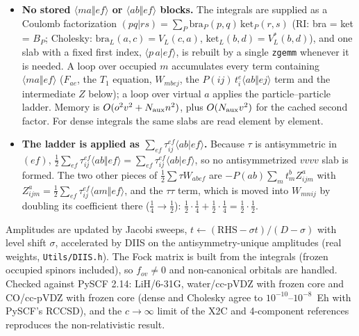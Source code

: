 \documentclass[11pt]{article}
\newcommand{\anti}[4]{\langle #1#2\Vert #3#4\rangle}
\newcommand{\dir}[4]{\langle #1#2|#3#4\rangle}
\begin{document}
\begin{itemize}
\item \textbf{No stored $\langle ma\Vert ef\rangle$ or $\langle ab\Vert ef\rangle$ blocks.} The integrals are
 supplied as a Coulomb factorization $(pq|rs)=\sum_P \mathrm{bra}_P(p,q)\,\mathrm{ket}_P(r,s)$ (RI: bra = ket = $B_P$;
 Cholesky: $\mathrm{bra}_L(a,c)=V_L(c,a)$, $\mathrm{ket}_L(b,d)=V_L^*(b,d)$), and one slab with a fixed first index,
 $\langle p\,a|e f\rangle$, is rebuilt by a single \texttt{zgemm} whenever it is needed. A loop over occupied $m$
 accumulates every term containing $\langle ma\Vert ef\rangle$ ($F_{ae}$, the $T_1$ equation, $W_{mbej}$, the
 $P(ij)\,t_i^e\langle ab\Vert ej\rangle$ term and the intermediate $Z$ below); a loop over virtual $a$ applies
 the particle--particle ladder. Memory is $O(o^2v^2+N_{\rm aux}n^2)$, plus $O(N_{\rm aux}v^2)$ for the cached
 second factor. For dense integrals the same slabs are read element by element.
\item \textbf{The ladder is applied as $\sum_{ef}\tau_{ij}^{ef}\langle ab|ef\rangle$.} Because $\tau$ is antisymmetric
 in $(ef)$, $\tfrac12\sum_{ef}\tau_{ij}^{ef}\anti{a}{b}{e}{f}=\sum_{ef}\tau_{ij}^{ef}\dir{a}{b}{e}{f}$, so no
 antisymmetrized $vvvv$ slab is formed. The two other pieces of $\tfrac12\sum\tau W_{abef}$ are
 $-P(ab)\sum_m t_m^b Z_{ijm}^a$ with $Z_{ijm}^a=\tfrac12\sum_{ef}\tau_{ij}^{ef}\anti{a}{m}{e}{f}$, and the
 $\tau\tau$ term, which is moved into $W_{mnij}$ by doubling its coefficient there
 ($\tfrac14\to\tfrac12$): $\tfrac12\cdot\tfrac14+\tfrac12\cdot\tfrac14=\tfrac12\cdot\tfrac12$.
\end{itemize}

Amplitudes are updated by Jacobi sweeps, $t\leftarrow(\mathrm{RHS}-\sigma t)/(D-\sigma)$ with level shift $\sigma$,
accelerated by DIIS on the antisymmetry-unique amplitudes (real weights, \texttt{Utils/DIIS.h}). The Fock matrix
is built from the integrals (frozen occupied spinors included), so $f_{ov}\neq0$ and non-canonical orbitals are
handled. Checked against PySCF 2.14: LiH/6-31G, water/cc-pVDZ with frozen core and CO/cc-pVDZ with frozen core
(dense and Cholesky agree to $10^{-10}$--$10^{-8}$~Eh with PySCF's RCCSD), and the $c\to\infty$ limit of the
X2C and 4-component references reproduces the non-relativistic result.
\end{document}

